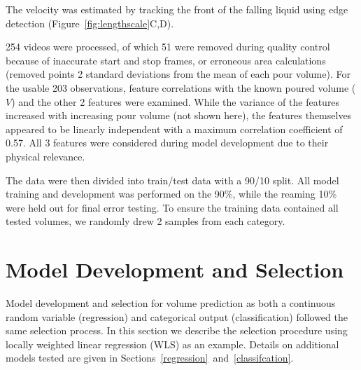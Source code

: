\documentclass[twocolumn,10pt]{article}
\begin{document}
The velocity was estimated by tracking the front of the falling liquid using edge detection (Figure~\ref{fig:lengthscale}C,D). 
 
254 videos were processed, of which 51 were removed during quality control because of inaccurate start and stop frames, or erroneous area calculations (removed points 2 standard deviations from the mean of each pour volume). For the usable 203 observations, feature correlations with the known poured volume ($V$) and the other 2 features were examined. While the variance of the features increased with increasing pour volume (not shown here), the features themselves appeared to be linearly independent with a maximum correlation coefficient of 0.57. All 3 features were considered during model development due to their physical relevance.
 
The data were then divided into train/test data with a 90/10 split. All model training and development was performed on the 90\%, while the reaming 10\% were held out for final error testing. To ensure the training data contained all tested volumes, we randomly drew 2 samples from each category.

\section{Model Development and Selection}
\label{mdoel selection}
Model development and selection for volume prediction as both a continuous random variable (regression) and categorical output (classification) followed the same selection process. In this section we describe the selection procedure using locally weighted linear regression (WLS) as an example. Details on additional models tested are given in Sections~\ref{regression}~and~\ref{classifcation}.
\end{document}
